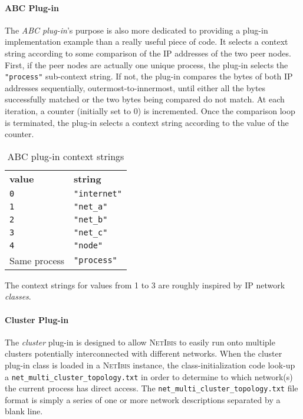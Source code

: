 \documentclass[11pt]{book}
\def\sep{\\[0.5ex]}
\def\NetIbis{\textsc{NetIbis}\xspace}
\begin{document}
\paragraph{ABC Plug-in}
\label{sec:abc-plugin}
The \emph{ABC plug-in}'s purpose is also more dedicated to providing a
plug-in implementation example than a really useful piece of code. It
selects a context string according to some comparison of the IP
addresses of the two peer nodes. First, if the peer nodes are actually
one unique process, the plug-in selects the \texttt{"process"}
sub-context string. If not, the plug-in compares the bytes of both IP
addresses sequentially, outermost-to-innermost, until either all the
bytes successfully matched or the two bytes being compared do not
match. At each iteration, a counter (initially set to 0) is
incremented. Once the comparison loop is terminated, the plug-in
selects a context string according to the value of the counter. 
\begin{table}[htbp]
  \centering
  \begin{tabular}{p{4cm}p{6cm}}
    \hline
    \textbf{value}    & \textbf{string} \sep
    \texttt{0}        & \texttt{"internet"}\sep
    \texttt{1}        & \texttt{"net\_a"}\\
    \texttt{2}        & \texttt{"net\_b"}\\
    \texttt{3}        & \texttt{"net\_c"}\sep
    \texttt{4}        & \texttt{"node"}\sep
    Same process      & \texttt{"process"}\\
    \hline
  \end{tabular}
  \caption{ABC plug-in context strings}
  \label{tab:abc-strings}
\end{table}
The context strings for values from 1 to 3 are roughly inspired by
IP network \emph{classes}.

\paragraph{Cluster Plug-in}
\label{sec:cluster-plugin}
The \emph{cluster} plug-in is designed to allow \NetIbis to easily run
onto multiple clusters potentially interconnected with different
networks. When the cluster plug-in class is loaded in a \NetIbis
instance, the class-initialization code look-up a
\texttt{net\_multi\_cluster\_topology.txt} in order to determine to
which network(s) the current process has direct access. The
\texttt{net\_multi\_cluster\_topology.txt} file format is simply a
series of one or more network descriptions separated by a blank line.
\end{document}
